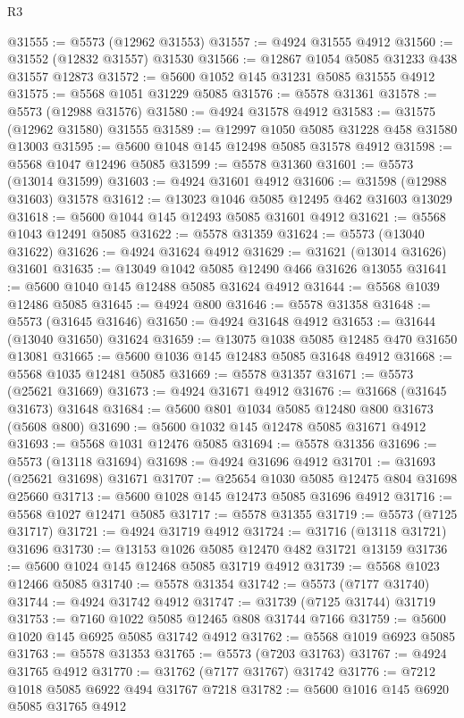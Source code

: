 \begin{lexlean}{R3}
\begin{coremodule}
@31555 := @5573 (@12962 @31553)
@31557 := @4924 @31555 @4912
@31560 := @31552 (@12832 @31557) @31530
@31566 := @12867 @1054 @5085 @31233 @438 @31557 @12873
@31572 := @5600 @1052 @145 @31231 @5085 @31555 @4912
@31575 := @5568 @1051 @31229 @5085
@31576 := @5578 @31361
@31578 := @5573 (@12988 @31576)
@31580 := @4924 @31578 @4912
@31583 := @31575 (@12962 @31580) @31555
@31589 := @12997 @1050 @5085 @31228 @458 @31580 @13003
@31595 := @5600 @1048 @145 @12498 @5085 @31578 @4912
@31598 := @5568 @1047 @12496 @5085
@31599 := @5578 @31360
@31601 := @5573 (@13014 @31599)
@31603 := @4924 @31601 @4912
@31606 := @31598 (@12988 @31603) @31578
@31612 := @13023 @1046 @5085 @12495 @462 @31603 @13029
@31618 := @5600 @1044 @145 @12493 @5085 @31601 @4912
@31621 := @5568 @1043 @12491 @5085
@31622 := @5578 @31359
@31624 := @5573 (@13040 @31622)
@31626 := @4924 @31624 @4912
@31629 := @31621 (@13014 @31626) @31601
@31635 := @13049 @1042 @5085 @12490 @466 @31626 @13055
@31641 := @5600 @1040 @145 @12488 @5085 @31624 @4912
@31644 := @5568 @1039 @12486 @5085
@31645 := @4924 @800
@31646 := @5578 @31358
@31648 := @5573 (@31645 @31646)
@31650 := @4924 @31648 @4912
@31653 := @31644 (@13040 @31650) @31624
@31659 := @13075 @1038 @5085 @12485 @470 @31650 @13081
@31665 := @5600 @1036 @145 @12483 @5085 @31648 @4912
@31668 := @5568 @1035 @12481 @5085
@31669 := @5578 @31357
@31671 := @5573 (@25621 @31669)
@31673 := @4924 @31671 @4912
@31676 := @31668 (@31645 @31673) @31648
@31684 := @5600 @801 @1034 @5085 @12480 @800 @31673 (@5608 @800)
@31690 := @5600 @1032 @145 @12478 @5085 @31671 @4912
@31693 := @5568 @1031 @12476 @5085
@31694 := @5578 @31356
@31696 := @5573 (@13118 @31694)
@31698 := @4924 @31696 @4912
@31701 := @31693 (@25621 @31698) @31671
@31707 := @25654 @1030 @5085 @12475 @804 @31698 @25660
@31713 := @5600 @1028 @145 @12473 @5085 @31696 @4912
@31716 := @5568 @1027 @12471 @5085
@31717 := @5578 @31355
@31719 := @5573 (@7125 @31717)
@31721 := @4924 @31719 @4912
@31724 := @31716 (@13118 @31721) @31696
@31730 := @13153 @1026 @5085 @12470 @482 @31721 @13159
@31736 := @5600 @1024 @145 @12468 @5085 @31719 @4912
@31739 := @5568 @1023 @12466 @5085
@31740 := @5578 @31354
@31742 := @5573 (@7177 @31740)
@31744 := @4924 @31742 @4912
@31747 := @31739 (@7125 @31744) @31719
@31753 := @7160 @1022 @5085 @12465 @808 @31744 @7166
@31759 := @5600 @1020 @145 @6925 @5085 @31742 @4912
@31762 := @5568 @1019 @6923 @5085
@31763 := @5578 @31353
@31765 := @5573 (@7203 @31763)
@31767 := @4924 @31765 @4912
@31770 := @31762 (@7177 @31767) @31742
@31776 := @7212 @1018 @5085 @6922 @494 @31767 @7218
@31782 := @5600 @1016 @145 @6920 @5085 @31765 @4912

\end{coremodule}
\end{lexlean}
